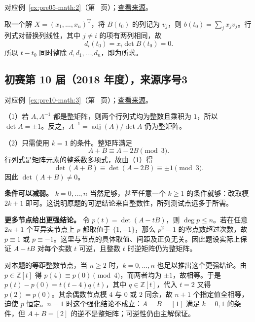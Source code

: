 \documentclass[12pt,fontset=fandol]{ctexart}
\begin{document}
对应例~\ref{ex:pre05-math:2}（第~\pageref{ex:pre05-math:2} 页）；\href{https://github.com/lzxcr/cmc-mathematics/blob/64916fa1fdbc3e444a652eca204d5669058ee321/src/problems/preliminary/05/02.md}{查看来源}。

\begin{solve}

取一个解 $X=(x_1,\ldots,x_n)^{\mathrm T}$，将 $B(t_0)$ 的列记为 $v_j$，则 $b(t_0)=\sum_jx_jv_j$。行列式对替换列线性，其中 $j\ne i$ 的项有两列相同，故
\[
d_i(t_0)=x_i\det B(t_0)=0.
\]
所以 $t-t_0$ 同时整除 $d,d_1,\ldots,d_n$，即为所求。

\end{solve}

\subsection{初赛第 10 届（2018 年度），来源序号3}\label{ans:pre10-math:3}\label{pr:pre10-math:3}

对应例~\ref{ex:pre10-math:3}（第~\pageref{ex:pre10-math:3} 页）；\href{https://github.com/lzxcr/cmc-mathematics/blob/64916fa1fdbc3e444a652eca204d5669058ee321/src/problems/preliminary/10/03.md}{查看来源}。

\begin{solve}

（1）若 $A,A^{-1}$ 都是整矩阵，则两个行列式均为整数且乘积为 $1$，所以 $\det A=\pm1$。反之，$A^{-1}=\operatorname{adj}(A)/\det A$ 仍为整矩阵。

（2）只需使用 $k=1$ 的条件。整矩阵满足
\[
A+B\equiv A-2B\pmod3.
\]
行列式是矩阵元素的整系数多项式，故由（1）得
\[
\det(A+B)\equiv\det(A-2B)\equiv\pm1\pmod3.
\]
因此 $\det(A+B)\ne0$。

\end{solve}

\begin{remark}[方法与条件]

\textbf{条件可以减弱。} $k=0,\ldots,n$ 当然足够，甚至任意一个 $k\ge1$ 的条件就够：改取模 $2k+1$ 即可。这说明原题的可逆结论来自整数性，所列测试点远多于所需。

\textbf{更多节点给出更强结论。} 令 $p(t)=\det(A-tB)$，则 $\deg p\le n$。若在任意 $2n+1$ 个互异实节点上 $p$ 都取值于 $\{1,-1\}$，那么 $p^2-1$ 的零点数超过次数，故 $p\equiv1$ 或 $p\equiv-1$。这里与节点的具体取值、间距及正负无关。因此题设实际上保证 $A-tB$ 对每个实数 $t$ 可逆，且整数 $t$ 时逆矩阵仍为整矩阵。

对本题的等距整数节点，当 $n\ge2$ 时，$k=0,\ldots,n$ 也足以推出这个更强结论。由 $p\in\mathbb Z[t]$ 得 $p(4)\equiv p(0)\pmod4$，而两者均为 $\pm1$，故相等。于是 $p(t)-p(0)=t(t-4)q(t)$，其中 $q\in\mathbb Z[t]$，代入 $t=2$ 又得 $p(2)=p(0)$。其余偶数节点模 $4$ 与 $0$ 或 $2$ 同余，故 $n+1$ 个指定值全相等，迫使 $p$ 恒定。$n=1$ 时这个强化结论不成立：$A=B=[1]$ 满足 $k=0,1$ 的条件，但 $A+B=[2]$ 的逆不是整矩阵；可逆性仍由主解保证。

\end{remark}
\end{document}
